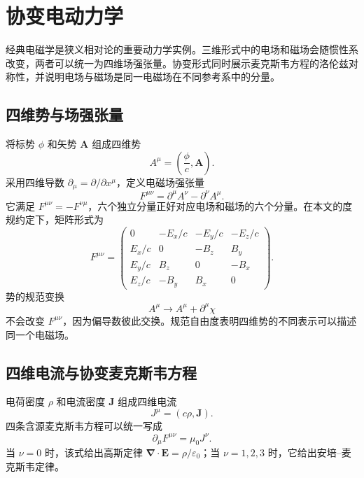 \documentclass[style=classic,color=full]{lc-article}
\begin{document}
\section{协变电动力学}

经典电磁学是狭义相对论的重要动力学实例。三维形式中的电场和磁场会随惯性系改变，两者可以统一为四维场强张量。协变形式同时展示麦克斯韦方程的洛伦兹对称性，并说明电场与磁场是同一电磁场在不同参考系中的分量。

\subsection{四维势与场强张量}

将标势 $\phi$ 和矢势 $\bm A$ 组成四维势
\begin{equation}
  A^\mu=\left(\frac{\phi}{c},\bm A\right).
  \label{eq:fourpotential}
\end{equation}
采用四维导数 $\partial_\mu=\partial/\partial x^\mu$，定义电磁场强张量
\begin{equation}
  F^{\mu\nu}
  =\partial^\mu A^\nu-\partial^\nu A^\mu.
  \label{eq:fieldstrength}
\end{equation}
它满足 $F^{\mu\nu}=-F^{\nu\mu}$，六个独立分量正好对应电场和磁场的六个分量。在本文的度规约定下，矩阵形式为
\begin{equation}
  F^{\mu\nu}=
  \begin{pmatrix}
    0&-E_x/c&-E_y/c&-E_z/c\\
    E_x/c&0&-B_z&B_y\\
    E_y/c&B_z&0&-B_x\\
    E_z/c&-B_y&B_x&0
  \end{pmatrix}.
  \label{eq:fieldstrengthmatrix}
\end{equation}
势的规范变换
\begin{equation}
  A^\mu\longrightarrow A^\mu+\partial^\mu\chi
\end{equation}
不会改变 $F^{\mu\nu}$，因为偏导数彼此交换。规范自由度表明四维势的不同表示可以描述同一个电磁场。

\subsection{四维电流与协变麦克斯韦方程}

电荷密度 $\rho$ 和电流密度 $\bm J$ 组成四维电流
\begin{equation}
  J^\mu=(c\rho,\bm J).
  \label{eq:fourcurrent}
\end{equation}
四条含源麦克斯韦方程可以统一写成
\begin{equation}
  \boxed{\partial_\mu F^{\mu\nu}=\mu_0J^\nu.}
  \label{eq:covariantmaxwellsource}
\end{equation}
当 $\nu=0$ 时，该式给出高斯定律 $\bm\nabla\mathbin{\cdot}\bm E=\rho/\varepsilon_0$；当 $\nu=1,2,3$ 时，它给出安培--麦克斯韦定律。
\end{document}

